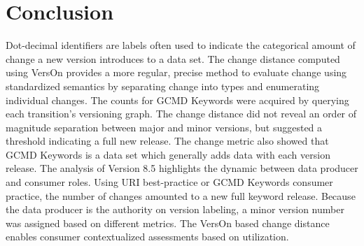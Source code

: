 \section{Conclusion}

Dot-decimal identifiers are labels often used to indicate the categorical amount of change a new version introduces to a data set.
The change distance computed using VersOn provides a more regular, precise method to evaluate change using standardized semantics by separating change into types and enumerating individual changes.
The counts for GCMD Keywords were acquired by querying each transition's versioning graph.
The change distance did not reveal an order of magnitude separation between major and minor versions, but suggested a threshold indicating a full new release.
The change metric also showed that GCMD Keywords is a data set which generally adds data with each version release.
The analysis of Version 8.5 highlights the dynamic between data producer and consumer roles.
Using URI best-practice or GCMD Keywords consumer practice, the number of changes amounted to a new full keyword release.
Because the data producer is the authority on version labeling, a minor version number was assigned based on different metrics.
The VersOn based change distance enables consumer contextualized assessments based on utilization.